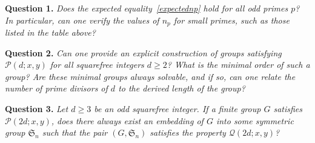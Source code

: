 \documentclass[12pt]{amsart}
\numberwithin{equation}{section}
\theoremstyle{definition}
\theoremstyle{remark}
\begin{document}
\noindent \textbf{Question 1.} \emph{Does the expected equality~\eqref{expectednp} hold for all odd primes $p$? In particular, can one verify the values of $n_p$ for small primes, such as those listed in the table above?}

\noindent \textbf{Question 2.} \emph{Can one provide an explicit construction of groups satisfying $\mathcal{P}(d;x,y)$ for all squarefree integers $d\ge 2$? What is the minimal order of such a group? Are these minimal groups always solvable, and if so, can one relate the number of prime divisors of $d$ to the derived length of the group?}

\noindent \textbf{Question 3.} \emph{Let $d\ge 3$ be an odd squarefree integer. If a finite group $G$ satisfies $\mathcal{P}(2d;x,y)$, does there always exist an embedding of $G$ into some symmetric group $\mathfrak{S}_n$ such that the pair $(G,\mathfrak{S}_n)$ satisfies the property $\mathcal{Q}(2d;x,y)$?}
\end{document}

